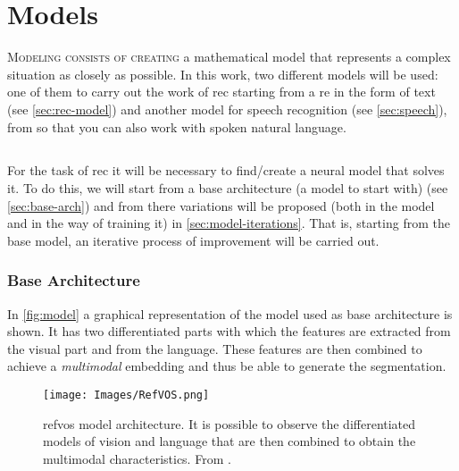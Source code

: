 

\chapter{Models}\label{cha:models}



\lettrine{M}{odeling consists of creating} a mathematical model that represents
a complex situation as closely as possible. In this work, two different models
will be used: one of them to carry out the work of \gls{rec} starting from a
\gls{re} in the form of text (see \vref{sec:rec-model}) and another model for
speech recognition (see \vref{sec:speech}), from so that you can also work with
spoken natural language.



\section{}\label{sec:rec-model}

For the task of \gls{rec} it will be necessary to find/create a neural model
that solves it. To do this, we will start from a base architecture (a model to
start with) (see \vref{sec:base-arch}) and from there variations will be
proposed (both in the model and in the way of training it) in
\vref{sec:model-iterations}. That is, starting from the base model, an
iterative process of improvement will be carried out.


\subsection{Base Architecture}\label{sec:base-arch}

In \vref{fig:model} a graphical representation of the model used as base
architecture is shown. It has two differentiated parts with which the features
are extracted from the visual part and from the language. These features are
then combined to achieve a \emph{multimodal} embedding and thus be able to
generate the segmentation.

\begin{figure}[ht]
  \centering
  \texttt{[image: Images/RefVOS.png]}
  \caption[ model architecture]{\gls{refvos} model
    architecture. It is possible to observe the differentiated models of vision
    and language that are then combined to obtain the multimodal
    characteristics. From .}\label{fig:model}
\end{figure}

